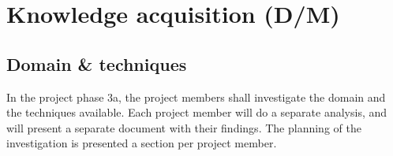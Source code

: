 
\section{Knowledge acquisition (D/M)}
\label{sec:knowledge-acquisition}

\subsection{Domain \& techniques}
%
In the project phase 3a, the project members shall investigate the domain and the techniques available.
Each project member will do a separate analysis, and will present a separate document with their findings.
The planning of the investigation is presented a section per project member.

